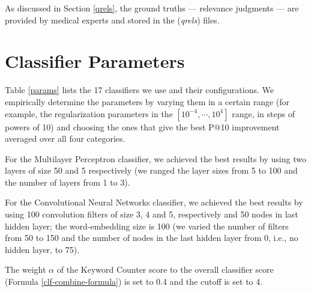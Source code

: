 As discussed in Section \ref{qrels}, the ground truths --- relevance judgments --- are provided by medical experts
and stored in the (\emph{qrels}) files.

\section{Classifier Parameters}
Table \ref{params} lists the 17 classifiers we use and their configurations.
We empirically determine
the
parameters by varying them in a certain range (for example, the regularization parameters
in the $[10^{-4},\cdots,10^4]$ range, in steps of powers of 10) and choosing the ones
that give the
best P@10 improvement averaged over all four categories.

For the Multilayer Perceptron classifier, we achieved the best results by using two layers of size 50 and 5 respectively
(we ranged the layer sizes from 5 to 100 and the number of layers from 1 to 3).

For the Convolutional Neural Networks classifier, we achieved the best results by
using 100 convolution filters of size 3, 4 and 5, respectively and 50 nodes in last hidden layer; the word-embedding size is 100
(we varied the number of filters from 50 to 150 and the number of nodes in the last hidden layer from 0, i.e., no hidden layer, to 75).

The weight $\alpha$ of the Keyword Counter score to the overall classifier score (Formula \ref{clf-combine-formula}) is set to 0.4 and
the \textsf{cutoff} is set to 4.

